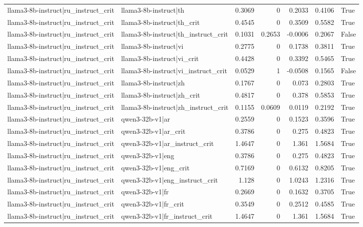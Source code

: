 \begin{table}
\begin{tabular}{l l r r r r l}
llama3-8b-instruct|ru_instruct_crit & llama3-8b-instruct|th & 0.3069 & 0 & 0.2033 & 0.4106 & True \\
llama3-8b-instruct|ru_instruct_crit & llama3-8b-instruct|th_crit & 0.4545 & 0 & 0.3509 & 0.5582 & True \\
llama3-8b-instruct|ru_instruct_crit & llama3-8b-instruct|th_instruct_crit & 0.1031 & 0.2653 & -0.0006 & 0.2067 & False \\
llama3-8b-instruct|ru_instruct_crit & llama3-8b-instruct|vi & 0.2775 & 0 & 0.1738 & 0.3811 & True \\
llama3-8b-instruct|ru_instruct_crit & llama3-8b-instruct|vi_crit & 0.4428 & 0 & 0.3392 & 0.5465 & True \\
llama3-8b-instruct|ru_instruct_crit & llama3-8b-instruct|vi_instruct_crit & 0.0529 & 1 & -0.0508 & 0.1565 & False \\
llama3-8b-instruct|ru_instruct_crit & llama3-8b-instruct|zh & 0.1767 & 0 & 0.073 & 0.2803 & True \\
llama3-8b-instruct|ru_instruct_crit & llama3-8b-instruct|zh_crit & 0.4817 & 0 & 0.378 & 0.5853 & True \\
llama3-8b-instruct|ru_instruct_crit & llama3-8b-instruct|zh_instruct_crit & 0.1155 & 0.0609 & 0.0119 & 0.2192 & True \\
llama3-8b-instruct|ru_instruct_crit & qwen3-32b-v1|ar & 0.2559 & 0 & 0.1523 & 0.3596 & True \\
llama3-8b-instruct|ru_instruct_crit & qwen3-32b-v1|ar_crit & 0.3786 & 0 & 0.275 & 0.4823 & True \\
llama3-8b-instruct|ru_instruct_crit & qwen3-32b-v1|ar_instruct_crit & 1.4647 & 0 & 1.361 & 1.5684 & True \\
llama3-8b-instruct|ru_instruct_crit & qwen3-32b-v1|eng & 0.3786 & 0 & 0.275 & 0.4823 & True \\
llama3-8b-instruct|ru_instruct_crit & qwen3-32b-v1|eng_crit & 0.7169 & 0 & 0.6132 & 0.8205 & True \\
llama3-8b-instruct|ru_instruct_crit & qwen3-32b-v1|eng_instruct_crit & 1.128 & 0 & 1.0243 & 1.2316 & True \\
llama3-8b-instruct|ru_instruct_crit & qwen3-32b-v1|fr & 0.2669 & 0 & 0.1632 & 0.3705 & True \\
llama3-8b-instruct|ru_instruct_crit & qwen3-32b-v1|fr_crit & 0.3549 & 0 & 0.2512 & 0.4585 & True \\
llama3-8b-instruct|ru_instruct_crit & qwen3-32b-v1|fr_instruct_crit & 1.4647 & 0 & 1.361 & 1.5684 & True \\

\end{tabular}
\end{table}
